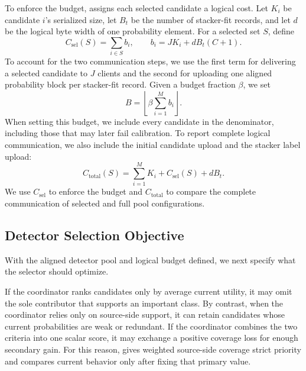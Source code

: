 To enforce the budget, \Fname assigns each selected candidate a logical cost. Let
$K_i$ be candidate $i$'s serialized size, let $B_t$ be the number of
stacker-fit records, and let $d$ be the logical byte width of one probability
element. For a selected set $S$, define
\begin{equation}
C_{\mathrm{sel}}(S)=\sum_{i\in S}b_i,
\qquad
b_i=J K_i+dB_t(C+1).
\label{eq:candidate_cost}
\end{equation}
To account for the two communication steps, we use the first term for
delivering a selected candidate to $J$ clients and the second for uploading
one aligned probability block per stacker-fit record. Given a budget fraction
$\beta$, we set
\begin{equation}
B=\left\lfloor\beta\sum_{i=1}^{M}b_i\right\rfloor.
\label{eq:logical_budget}
\end{equation}
When setting this budget, we include every candidate in the denominator,
including those that may later fail calibration. To report complete logical
communication, we also include the initial candidate upload and the stacker
label upload:
\begin{equation}
C_{\mathrm{total}}(S)=\sum_{i=1}^{M}K_i+C_{\mathrm{sel}}(S)+dB_t.
\label{eq:total_logical_communication}
\end{equation}
We use $C_{\mathrm{sel}}$ to enforce the budget and $C_{\mathrm{total}}$ to
compare the complete communication of selected and full pool configurations.

\subsection{Detector Selection Objective}

With the aligned detector pool and logical budget defined, we next specify
what the selector should optimize.

If the coordinator ranks candidates only by average current utility, it may
omit the sole contributor that supports an important class. By contrast, when
the coordinator relies only on source-side support, it can retain candidates
whose current probabilities are weak or redundant. If the coordinator combines
the two criteria into one scalar score, it may exchange a positive coverage
loss for enough secondary gain. For this reason, \Fname gives weighted
source-side coverage strict priority and compares current behavior only after
fixing that primary value.

